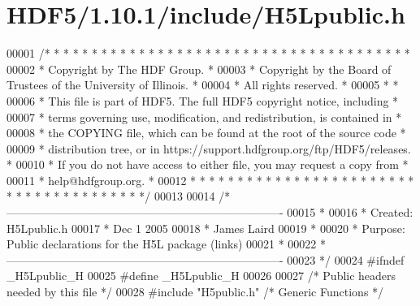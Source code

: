 \hypertarget{_h_d_f5_21_810_81_2include_2_h5_lpublic_8h_source}{}\section{H\+D\+F5/1.10.1/include/\+H5\+Lpublic.h}
\label{_h_d_f5_21_810_81_2include_2_h5_lpublic_8h_source}

\begin{DoxyCode}
00001 \textcolor{comment}{/* * * * * * * * * * * * * * * * * * * * * * * * * * * * * * * * * * * * * * *}
00002 \textcolor{comment}{ * Copyright by The HDF Group.                                               *}
00003 \textcolor{comment}{ * Copyright by the Board of Trustees of the University of Illinois.         *}
00004 \textcolor{comment}{ * All rights reserved.                                                      *}
00005 \textcolor{comment}{ *                                                                           *}
00006 \textcolor{comment}{ * This file is part of HDF5.  The full HDF5 copyright notice, including     *}
00007 \textcolor{comment}{ * terms governing use, modification, and redistribution, is contained in    *}
00008 \textcolor{comment}{ * the COPYING file, which can be found at the root of the source code       *}
00009 \textcolor{comment}{ * distribution tree, or in https://support.hdfgroup.org/ftp/HDF5/releases.  *}
00010 \textcolor{comment}{ * If you do not have access to either file, you may request a copy from     *}
00011 \textcolor{comment}{ * help@hdfgroup.org.                                                        *}
00012 \textcolor{comment}{ * * * * * * * * * * * * * * * * * * * * * * * * * * * * * * * * * * * * * * */}
00013 
00014 \textcolor{comment}{/*-------------------------------------------------------------------------}
00015 \textcolor{comment}{ *}
00016 \textcolor{comment}{ * Created:             H5Lpublic.h}
00017 \textcolor{comment}{ *                      Dec 1 2005}
00018 \textcolor{comment}{ *                      James Laird}
00019 \textcolor{comment}{ *}
00020 \textcolor{comment}{ * Purpose:             Public declarations for the H5L package (links)}
00021 \textcolor{comment}{ *}
00022 \textcolor{comment}{ *-------------------------------------------------------------------------}
00023 \textcolor{comment}{ */}
00024 \textcolor{preprocessor}{#ifndef \_H5Lpublic\_H}
00025 \textcolor{preprocessor}{#define \_H5Lpublic\_H}
00026 
00027 \textcolor{comment}{/* Public headers needed by this file */}
00028 \textcolor{preprocessor}{#include "H5public.h"}       \textcolor{comment}{/* Generic Functions            */}

\end{DoxyCode}
